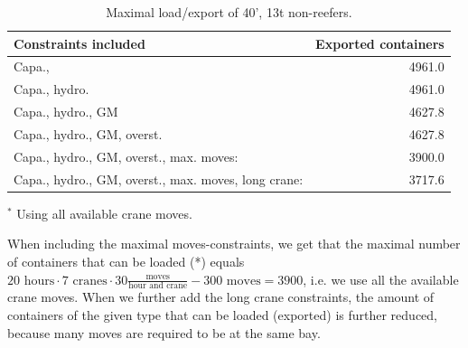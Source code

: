 \begin{table}[width=.9\linewidth,cols=2,pos=h]
\caption{Maximal load/export of 40', 13t non-reefers.}\label{tab:resultsPS}
\begin{threeparttable}
\begin{tabular*}{\tblwidth}{@{} LR @{}}
\toprule
Constraints included						  		&Exported containers\\
\midrule
Capa., 												&4961.0\phantom{\tn{$^{*}$}}\\
Capa., hydro. 										&4961.0\phantom{\tn{$^{*}$}}\\
Capa., hydro., GM									&4627.8\phantom{\tn{$^{*}$}}\\
Capa., hydro., GM, overst.							&4627.8\phantom{\tn{$^{*}$}}\\
Capa., hydro., GM, overst., max. moves:				&3900.0\tn{$^{*}$}\\ 
Capa., hydro., GM, overst., max. moves, long crane:	&3717.6\phantom{\tn{$^{*}$}}\\
\bottomrule
\end{tabular*}
\begin{tablenotes}
\item[$^*$]Using all available crane moves.
\end{tablenotes}
\end{threeparttable}
\end{table}

When including the maximal moves-constraints, we get that the maximal number of containers that can be loaded (*) equals $20\text{ hours}\cdot7\text{ cranes}\cdot 30 \frac{\text{moves}}{\text{hour and crane}} - 300 \text{ moves} = 3900$, i.e. we use all the available crane moves.  
When we further add the long crane constraints, the amount of containers of the given type that can be loaded (exported) is further reduced, because many moves are required to be at the same bay.

